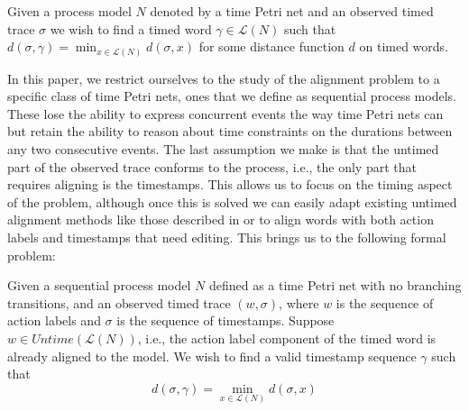 \documentclass[runningheads]{llncs}
\begin{document}
    \begin{definition}
        Given a process model $N$ denoted by a time Petri net and an observed timed trace $\sigma$ we wish to find a timed word $\gamma \in \mathcal{L}(N)$ such that $d(\sigma, \gamma) = \min_{x \in \mathcal{L}(N)} d(\sigma, x)$ for some distance function $d$ on timed words. 
    \end{definition}
    
    In this paper, we restrict ourselves to the study of the alignment problem to a specific class of time Petri nets, ones that we define as sequential process models. 
    These lose the ability to express concurrent events the way time Petri nets can but retain the ability to reason about time constraints on the durations between any two consecutive events. 
    The last assumption we make is that the untimed part of the observed trace conforms to the process, i.e., the only part that requires aligning is the timestamps. 
    This allows us to focus on the timing aspect of the problem, although once this is solved we can easily adapt existing untimed alignment methods like those described in \cite{Adriansyah2014AligningOA} or \cite{BCC21} to align words with both action labels and timestamps that need editing. 
    This brings us to the following formal problem: 
    
    \begin{definition}
        Given a sequential process model $N$ defined as a time Petri net with no branching transitions, and an observed timed trace $(w, \sigma)$, where $w$ is the sequence of action labels and $\sigma$ is the sequence of timestamps. Suppose $w \in Untime(\mathcal{L}(N))$, i.e., the action label component of the timed word is already aligned to the model. We wish to find a valid timestamp sequence $\gamma$ such that $$d(\sigma, \gamma) = \min_{x \in \mathcal{L}(N)} d(\sigma, x)$$
    \end{definition}
    
\end{document}
